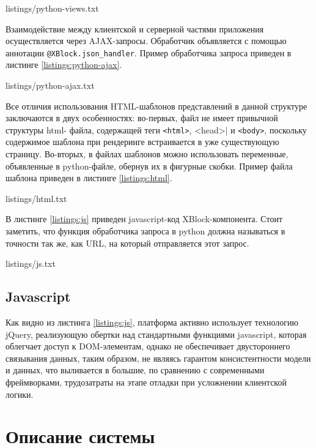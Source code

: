 
{listings/python-views.txt}

Взаимодействие между клиентской и серверной частями приложения
осуществляется через AJAX-запросы. Обработчик объявляется с помощью аннотации
\lstinline|@XBlock.json_handler|. Пример обработчика запроса приведен в листинге \ref{listings:python-ajax}.



{listings/python-ajax.txt}


Все отличия использования HTML-шаблонов представлений в данной структуре
заключаются в двух особенностях: во-первых, файл не имеет привычной структуры html- файла, содержащей теги \lstinline|<html>|, \lstinline||<head>| и \lstinline|<body>|, поскольку содержимое шаблона при рендеринге встраивается в уже существующую страницу. Во-вторых, в файлах шаблонов можно использовать переменные, объявленные в python-файле, обернув их в фигурные скобки. Пример файла шаблона приведен в листинге \ref{listings:html}.


{listings/html.txt}

В листинге \ref{listings:js} приведен javascript-код XBlock-компонента. Стоит заметить, что функция обработчика запроса в python должна называться в точности так же, как URL, на
который отправляется этот запрос.


{listings/js.txt}

\subsection{Javascript}

Как видно из листинга \ref{listings:js}, платформа активно использует технологию jQuery, реализующую обертки над стандартными функциями javascript, которая облегчает доступ к DOM-элементам, однако не обеспечивает двустороннего связывания данных, таким образом, не являясь гарантом консистентности модели и данных, что выливается в большие, по сравнению с современными фреймворками, трудозатраты на этапе отладки при усложнении клиентской логики.

\section{Описание системы}
